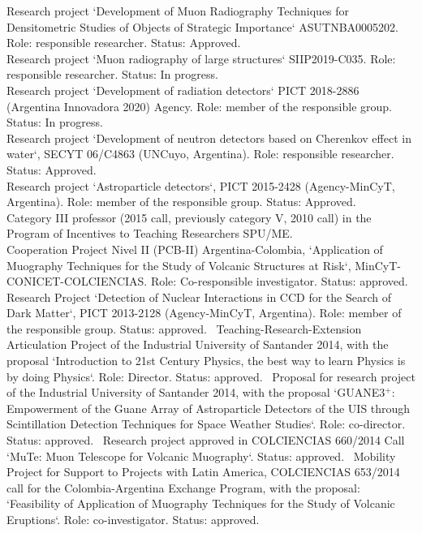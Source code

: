  Research project `Development of Muon Radiography Techniques for Densitometric Studies of Objects of Strategic Importance` ASUTNBA0005202. Role: responsible researcher. Status: Approved.\\
 Research project `Muon radiography of large structures` SIIP2019-C035. Role: responsible researcher. Status: In progress.\\
 Research project `Development of radiation detectors` PICT 2018-2886 (Argentina Innovadora 2020) Agency. Role: member of the responsible group. Status: In progress.\\
 Research project `Development of neutron detectors based on Cherenkov effect in water`, SECYT 06/C4863 (UNCuyo, Argentina). Role: responsible researcher. Status: Approved.\\
 Research project `Astroparticle detectors`, PICT 2015-2428 (Agency-MinCyT, Argentina). Role: member of the responsible group. Status: Approved.\\
 Category III professor (2015 call, previously category V, 2010 call) in the Program of Incentives to Teaching Researchers SPU/ME.\\
\ifres
\else
{} Cooperation Project Nivel II (PCB-II) Argentina-Colombia, `Application of Muography Techniques for the Study of Volcanic Structures at Risk`, MinCyT-CONICET-COLCIENCIAS. Role: Co-responsible investigator. Status: approved.\
 Research Project `Detection of Nuclear Interactions in CCD for the Search of Dark Matter`, PICT 2013-2128 (Agency-MinCyT, Argentina). Role: member of the responsible group. Status: approved.\
 Teaching-Research-Extension Articulation Project of the Industrial University of Santander 2014, with the proposal `Introduction to 21st Century Physics, the best way to learn Physics is by doing Physics`. Role: Director. Status: approved.\
 Proposal for research project of the Industrial University of Santander 2014, with the proposal `GUANE3$^+$: Empowerment of the Guane Array of Astroparticle Detectors of the UIS through Scintillation Detection Techniques for Space Weather Studies`. Role: co-director. Status: approved.\
 Research project approved in COLCIENCIAS 660/2014 Call `MuTe: Muon Telescope for Volcanic Muography`. Status: approved.\
 Mobility Project for Support to Projects with Latin America, COLCIENCIAS 653/2014 call for the Colombia-Argentina Exchange Program, with the proposal: `Feasibility of Application of Muography Techniques for the Study of Volcanic Eruptions`. Role: co-investigator. Status: approved.\
